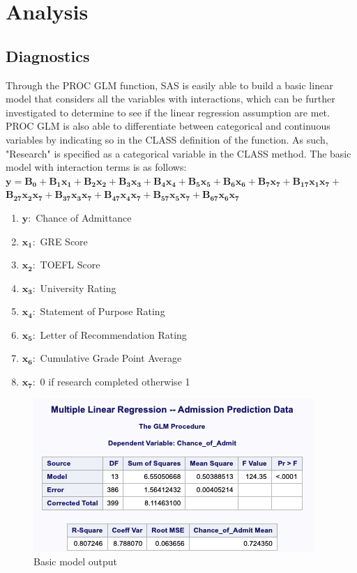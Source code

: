 \documentclass{article}
\begin{document}
\section*{Analysis}
\subsection*{Diagnostics}

Through the PROC GLM function, SAS is easily able to build a basic linear model that considers all the variables with interactions, which can be further investigated to determine to see if the linear regression assumption are met. PROC GLM is also able to differentiate between categorical and continuous variables by indicating so in the CLASS definition of the function. As such, "Research" is specified as a categorical variable in the CLASS method. The basic model with interaction terms is as follows: 
\\

$\mathbf{y = B_0 + B_1x_1 +  B_2x_2  +  B_3x_3 +  B_4x_4 +  B_5x_5 +  B_6x_6 +  B_7x_7  +   B_17x_1x_7 + }$ \\ $\mathbf{ B_27x_2x_7 + B_37x_3x_7 +  B_47x_4x_7 +  B_57x_5x_7 +  B_67x_6x_7}$
\\
\begin{enumerate}

\item $\mathbf{y:}$ Chance of Admittance
\item $\mathbf{x_1:}$ GRE Score
\item $\mathbf{x_2:}$ TOEFL Score
\item $\mathbf{x_3:}$ University Rating
\item $\mathbf{x_4:}$ Statement of Purpose Rating
\item $\mathbf{x_5:}$ Letter of Recommendation Rating
\item $\mathbf{x_6:}$ Cumulative Grade Point Average
\item $\mathbf{x_7:}$ 0 if research completed otherwise 1

\end{enumerate}

\begin{figure}
\centering
\includegraphics[scale=0.7]{basic_model_output.png}
\caption{Basic model output}
\label{fig:basicmodeloutput}
\end{figure}
\end{document}
